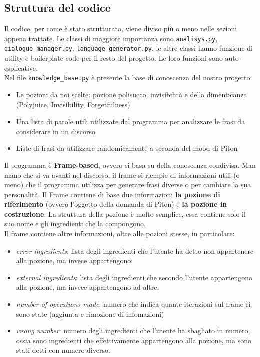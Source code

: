 \subsection{Struttura del codice}
Il codice, per come è stato strutturato, viene diviso più o meno nelle sezioni appena trattate. Le classi di maggiore importanza sono \texttt{analisys.py}, \texttt{dialogue\_manager.py}, \texttt{language\_generator.py}, le altre classi hanno funzione di utility e boilerplate code per il resto del progetto. Le loro funzioni sono auto-esplicative.
\\
Nel file \texttt{knowledge\_base.py} è presente la base di conoscenza del nostro progetto:
\begin{itemize}
    \item Le pozioni da noi scelte: pozione polisucco, invisibilità e della dimenticanza (Polyjuice, Invisibility, Forgetfulness)
    \item Una lista di parole utili utilizzate dal programma per analizzare le frasi da considerare in un discorso
    \item Liste di frasi da utilizzare randomicamente a seconda del mood di Piton
\end{itemize}
Il programma è \textbf{Frame-based}, ovvero si basa su della conoscenza condivisa. Man mano che si va avanti nel discorso, il frame si riempie di informazioni utili (o meno) che il programma utilizza per generare frasi diverse o per cambiare la sua personalità. Il Frame contiene di base due informazioni \textbf{la pozione di riferimento} (ovvero l'oggetto della domanda di Piton) e \textbf{la pozione in costruzione}.
La struttura della pozione è molto semplice, essa contiene solo il suo nome e gli ingredienti che la compongono.
\\
Il frame contiene altre informazioni, oltre alle pozioni stesse, in particolare:
\begin{itemize}
    \item \textit{error ingredients}: lista degli ingredienti che l'utente ha detto non appartenere alla pozione, ma invece appartengono;
    \item \textit{external ingredients}: lista degli ingredienti che secondo l'utente appartengono alla pozione, ma invece appartengono ad altre;
    \item \textit{number of operations made}: numero che indica quante iterazioni sul frame ci sono state (aggiunta e rimozione di infomazioni)
    \item \textit{wrong number}: numero degli ingredienti che l'utente ha sbagliato in numero, ossia sono ingredienti che effettivamente appartengono alla pozione, ma sono stati detti con numero diverso.
\end{itemize}